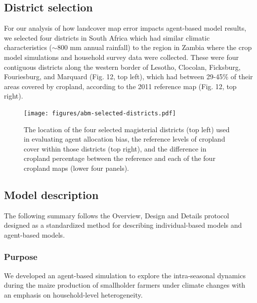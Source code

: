 \documentclass[11pt, titlepage]{article}
\begin{document}
\subsection{\large District selection}
For our analysis of how landcover map error impacts agent-based model results, we selected four districts in South Africa which had similar climatic characteristics ($\sim$800 mm annual rainfall) to the region in Zambia where the crop model simulations and household survey data were collected.  These were four contiguous districts along the western border of Lesotho, Clocolan, Ficksburg, Fouriesburg, and Marquard (Fig. 12, top left), which had between 29-45\% of their areas covered by cropland, according to the 2011 reference map (Fig. 12, top right).  

\begin{figure}[!ht]
  \centering
     \texttt{[image: figures/abm-selected-districts.pdf]} 
      \caption{The location of the four selected magisterial districts (top left) used in evaluating agent allocation bias, the reference levels of cropland cover within those districts (top right), and the difference in cropland percentage between the reference and each of the four cropland maps (lower four panels). }
      \label{fig:default}
\end{figure}

\subsection{\large Model description}

The following summary follows the Overview, Design and Details protocol \cite{grimm_standard_2006,polhill_using_2008} designed as a standardized method for describing individual-based models and agent-based models.

\subsubsection{Purpose} 
We developed an agent-based simulation to explore the intra-seasonal dynamics during the maize production of smallholder farmers under climate changes with an emphasis on household-level heterogeneity.
\end{document}
